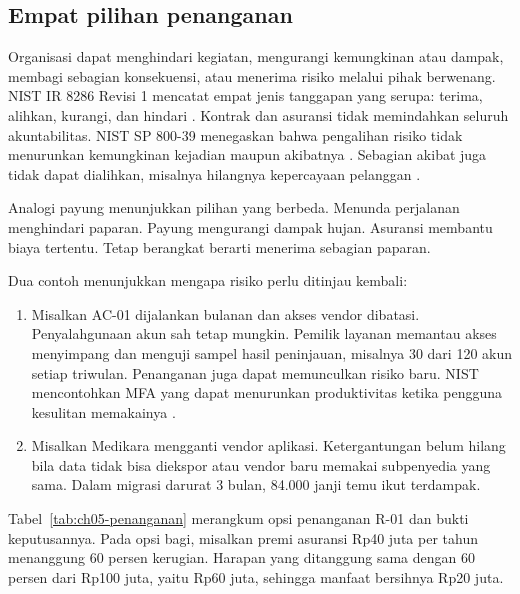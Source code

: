 \subsection*{Empat pilihan penanganan}

Organisasi dapat menghindari kegiatan, mengurangi kemungkinan atau dampak, membagi sebagian
konsekuensi, atau menerima risiko melalui pihak berwenang. NIST IR 8286 Revisi 1 mencatat empat jenis
tanggapan yang serupa: terima, alihkan, kurangi, dan hindari \cite{c05-nist-ir8286r1}. Kontrak dan
asuransi tidak memindahkan seluruh akuntabilitas. NIST SP 800-39 menegaskan bahwa pengalihan risiko
tidak menurunkan kemungkinan kejadian maupun akibatnya \cite{c05-nist-sp80039}. Sebagian akibat juga
tidak dapat dialihkan, misalnya hilangnya kepercayaan pelanggan \cite{c05-nist-ir8286r1}.

Analogi payung menunjukkan pilihan yang berbeda. Menunda perjalanan menghindari paparan. Payung
mengurangi dampak hujan. Asuransi membantu biaya tertentu. Tetap berangkat berarti menerima sebagian
paparan.

Dua contoh menunjukkan mengapa risiko perlu ditinjau kembali:
\begin{enumerate}
  \item Misalkan AC-01 dijalankan bulanan dan akses vendor dibatasi. Penyalahgunaan akun sah tetap
  mungkin. Pemilik layanan memantau akses menyimpang dan menguji sampel hasil peninjauan, misalnya 30
  dari 120 akun setiap triwulan. Penanganan juga dapat memunculkan risiko baru. NIST mencontohkan MFA
  yang dapat menurunkan produktivitas ketika pengguna kesulitan memakainya \cite{c05-nist-ir8286r1}.
  \item Misalkan Medikara mengganti vendor aplikasi. Ketergantungan belum hilang bila data tidak bisa
  diekspor atau vendor baru memakai subpenyedia yang sama. Dalam migrasi darurat 3 bulan, 84.000 janji
  temu ikut terdampak.
\end{enumerate}

Tabel~\ref{tab:ch05-penanganan} merangkum opsi penanganan R-01 dan bukti keputusannya. Pada opsi bagi,
misalkan premi asuransi Rp40 juta per tahun menanggung 60 persen kerugian. Harapan yang ditanggung sama
dengan 60 persen dari Rp100 juta, yaitu Rp60 juta, sehingga manfaat bersihnya Rp20 juta.


